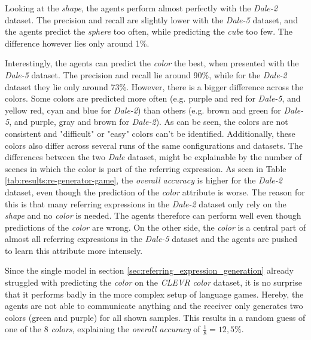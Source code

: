 Looking at the \emph{shape}, the agents perform almost perfectly with the \emph{Dale-2} dataset.
The precision and recall are slightly lower with the \emph{Dale-5} dataset, and the agents predict the \emph{sphere} too often, while predicting the \emph{cube} too few.
The difference however lies only around 1\%.

Interestingly, the agents can predict the \emph{color} the best, when presented with the \emph{Dale-5} dataset.
The precision and recall lie around 90\%, while for the \emph{Dale-2} dataset they lie only around 73\%.
However, there is a bigger difference across the colors.
Some colors are predicted more often (e.g. purple and red for \emph{Dale-5}, and yellow red, cyan and blue for \emph{Dale-2}) than others (e.g. brown and green for \emph{Dale-5}, and purple, gray and brown for \emph{Dale-2}).
As can be seen, the colors are not consistent and "difficult" or "easy" colors can't be identified.
Additionally, these colors also differ across several runs of the same configurations and datasets.
The differences between the two \emph{Dale} dataset, might be explainable by the number of scenes in which the color is part of the referring expression.
As seen in Table \ref{tab:results:re-generator-game}, the \emph{overall accuracy} is higher for the \emph{Dale-2} dataset, even though the prediction of the \emph{color} attribute is worse.
The reason for this is that many referring expressions in the \emph{Dale-2} dataset only rely on the \emph{shape} and no \emph{color} is needed.
The agents therefore can perform well even though predictions of the \emph{color} are wrong.
On the other side, the \emph{color} is a central part of almost all referring expressions in the \emph{Dale-5} dataset and the agents are pushed to learn this attribute more intensely.

Since the single model in section \ref{sec:referring_expression_generation} already struggled with predicting the \emph{color} on the \emph{CLEVR color} dataset, it is no surprise that it performs badly in the more complex setup of language games.
Hereby, the agents are not able to communicate anything and the receiver only generates two colors (green and purple) for all shown samples.
This results in a random guess of one of the 8 \emph{colors}, explaining the \emph{overall accuracy} of $\frac{1}{8}=12,5\%$.

